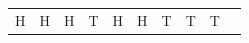 {{\begin{center}
\begin{xtabular}[t]{|l|l|l|l|l|l|l|l|l|l|}
    
        H &
    
    
        H &
    
    
        H &
    
    
        T &
    
    
        H &
    
    
        H &
    
    
        T &
    
    
        T &
    
    
        T%
     \tabularnewline{}
    

\end{xtabular}
\end{center}}}
